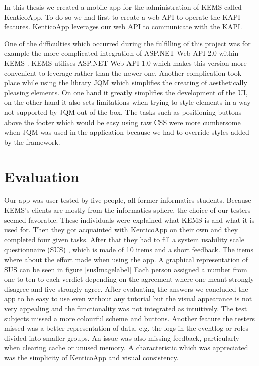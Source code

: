 In this thesis we created a mobile app for the administration of KEMS called KenticoApp. To do so we had first to create a web API to operate the KAPI features. KenticoApp leverages our web API to communicate with the KAPI. 

One of the difficulties which occurred during the fulfilling of this project was for example the more complicated integration of ASP.NET Web API 2.0 within KEMS \cite{kenticoWebAPI}. KEMS utilises ASP.NET Web API 1.0 which makes this version more convenient to leverage rather than the newer one. Another complication took place while using the library JQM which simplifies the creating of aesthetically pleasing elements. On one hand it greatly simplifies the development of the UI, on the other hand it also sets limitations when trying to style elements in a way not supported by JQM out of the box. The tasks such as positioning buttons above the footer which would be easy using raw CSS were more cumbersome when JQM was used in the application because we had to override styles added by the framework.

\section{Evaluation}
Our app was user-tested by five people, all former informatics students. Because KEMS's clients are mostly from the informatics sphere, the choice of our testers seemed favorable. These individuals were explained what KEMS is and what it is used for. Then they got acquainted with KenticoApp on their own and they completed four given tasks. After that they had to fill a system usability scale questionnaire (SUS) \cite{sus}, which is made of 10 items and a short feedback. The items where about the effort made when using the app. A graphical representation of SUS can be seen in figure \ref{susImagelabel} Each person assigned a number from one to ten to each verdict depending on the agreement where one meant strongly disagree and five strongly agree. After evaluating the answers we concluded the app to be easy to use even without any tutorial but the visual appearance is not very appealing and the functionality was not integrated as intuitively. The test subjects missed a more colourful scheme and buttons. Another feature the testers missed was a better representation of data, e.g. the logs in the eventlog or roles divided into smaller groups. An issue was also missing feedback, particularly when clearing cache or unused memory. A characteristic which was appreciated was the simplicity of KenticoApp and visual consistency.

